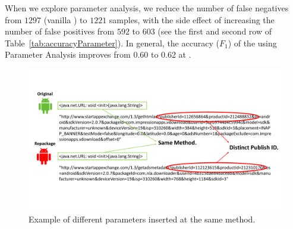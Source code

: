 When we explore parameter analysis, we reduce the number of false negatives from $1297$ (vanilla \mas) to $1221$ samples, with the side effect of increasing the number of false positives from $592$ to $603$ (see the first and second row of Table~\ref{tab:accuracyParameter}).
In general, the accuracy ($F_1$) of the \mas using Parameter Analysis improves from 0.60 to 0.62 at \cds.



\begin{figure}[t]
\centering
\includegraphics[scale=0.3]{images/parameterDiff.pdf}
\caption{Example of different parameters inserted at the same method.}
 \label{fig:parameterDiff}
\end{figure}

\begin{table}[ht]
  \caption{Accuracy of the \mas with aid of complementary techniques (3,211 app pairs).}
  \label{tab:accuracyParameter}
\end{table}


